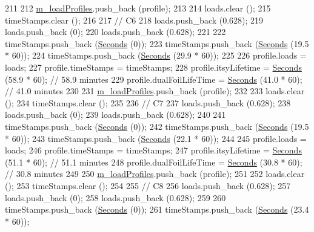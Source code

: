 \begin{DoxyCode}
211 
212   \hyperlink{classBatteryLifetimeTest_aee9ad324da18f58ee75689778580c3fb}{m\_loadProfiles}.push\_back (profile);
213 
214   loads.clear ();
215   timeStamps.clear ();
216 
217   \textcolor{comment}{// C6}
218   loads.push\_back (0.628);
219   loads.push\_back (0);
220   loads.push\_back (0.628);
221 
222   timeStamps.push\_back (\hyperlink{group__timecivil_ga33c34b816f8ff6628e33d5c8e9713b9e}{Seconds} (0));
223   timeStamps.push\_back (\hyperlink{group__timecivil_ga33c34b816f8ff6628e33d5c8e9713b9e}{Seconds} (19.5 * 60));
224   timeStamps.push\_back (\hyperlink{group__timecivil_ga33c34b816f8ff6628e33d5c8e9713b9e}{Seconds} (29.9 * 60));
225 
226   profile.loads = loads;
227   profile.timeStamps = timeStamps;
228   profile.itsyLifetime = \hyperlink{group__timecivil_ga33c34b816f8ff6628e33d5c8e9713b9e}{Seconds} (58.9 * 60);     \textcolor{comment}{// 58.9 minutes}
229   profile.dualFoilLifeTime = \hyperlink{group__timecivil_ga33c34b816f8ff6628e33d5c8e9713b9e}{Seconds} (41.0 * 60); \textcolor{comment}{// 41.0 minutes}
230 
231   \hyperlink{classBatteryLifetimeTest_aee9ad324da18f58ee75689778580c3fb}{m\_loadProfiles}.push\_back (profile);
232 
233   loads.clear ();
234   timeStamps.clear ();
235 
236   \textcolor{comment}{// C7}
237   loads.push\_back (0.628);
238   loads.push\_back (0);
239   loads.push\_back (0.628);
240 
241   timeStamps.push\_back (\hyperlink{group__timecivil_ga33c34b816f8ff6628e33d5c8e9713b9e}{Seconds} (0));
242   timeStamps.push\_back (\hyperlink{group__timecivil_ga33c34b816f8ff6628e33d5c8e9713b9e}{Seconds} (19.5 * 60));
243   timeStamps.push\_back (\hyperlink{group__timecivil_ga33c34b816f8ff6628e33d5c8e9713b9e}{Seconds} (22.1 * 60));
244 
245   profile.loads = loads;
246   profile.timeStamps = timeStamps;
247   profile.itsyLifetime = \hyperlink{group__timecivil_ga33c34b816f8ff6628e33d5c8e9713b9e}{Seconds} (51.1 * 60);     \textcolor{comment}{// 51.1 minutes}
248   profile.dualFoilLifeTime = \hyperlink{group__timecivil_ga33c34b816f8ff6628e33d5c8e9713b9e}{Seconds} (30.8 * 60); \textcolor{comment}{// 30.8 minutes}
249 
250   \hyperlink{classBatteryLifetimeTest_aee9ad324da18f58ee75689778580c3fb}{m\_loadProfiles}.push\_back (profile);
251 
252   loads.clear ();
253   timeStamps.clear ();
254 
255   \textcolor{comment}{// C8}
256   loads.push\_back (0.628);
257   loads.push\_back (0);
258   loads.push\_back (0.628);
259 
260   timeStamps.push\_back (\hyperlink{group__timecivil_ga33c34b816f8ff6628e33d5c8e9713b9e}{Seconds} (0));
261   timeStamps.push\_back (\hyperlink{group__timecivil_ga33c34b816f8ff6628e33d5c8e9713b9e}{Seconds} (23.4 * 60));

\end{DoxyCode}
